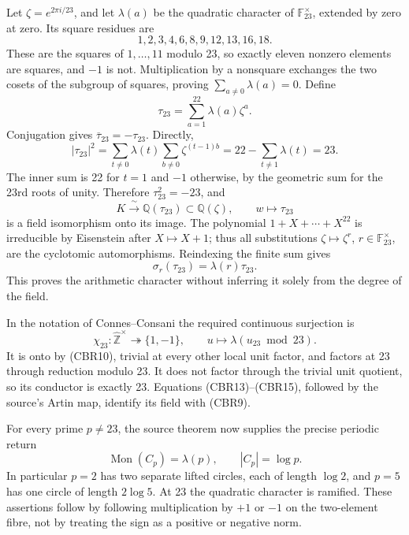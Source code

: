 \documentclass[
  10pt,
  a4paper,
]{article}
\begin{document}
Let \(\zeta=e^{2\pi i/23}\), and let \(\lambda(a)\) be the quadratic
character of \(\mathbb F_{23}^{\times}\), extended by zero at zero. Its
square residues are \[
1,2,3,4,6,8,9,12,13,16,18.
\tag{CBR10}
\] These are the squares of \(1,\ldots,11\) modulo 23, so exactly eleven
nonzero elements are squares, and \(-1\) is not. Multiplication by a
nonsquare exchanges the two cosets of the subgroup of squares, proving
\(\sum_{a\ne0}\lambda(a)=0\). Define \[
\tau_{23}=\sum_{a=1}^{22}\lambda(a)\zeta^a.
\tag{CBR11}
\] Conjugation gives \(\overline{\tau}_{23}=-\tau_{23}\). Directly, \[
|\tau_{23}|^2
=\sum_{t\ne0}\lambda(t)\sum_{b\ne0}\zeta^{(t-1)b}
=22-\sum_{t\ne1}\lambda(t)=23.
\tag{CBR12}
\] The inner sum is 22 for \(t=1\) and \(-1\) otherwise, by the
geometric sum for the 23rd roots of unity. Therefore
\(\tau_{23}^2=-23\), and \[
K\xrightarrow{\ \sim\ }\mathbb Q(\tau_{23})\subset\mathbb Q(\zeta),
\qquad w\longmapsto\tau_{23}
\tag{CBR13}
\] is a field isomorphism onto its image. The polynomial
\(1+X+\cdots+X^{22}\) is irreducible by Eisenstein after
\(X\mapsto X+1\); thus all substitutions \(\zeta\mapsto\zeta^r\),
\(r\in\mathbb F_{23}^{\times}\), are the cyclotomic automorphisms.
Reindexing the finite sum gives \[
\sigma_r(\tau_{23})=\lambda(r)\tau_{23}.
\tag{CBR14}
\] This proves the arithmetic character without inferring it solely from
the degree of the field.

In the notation of Connes--Consani the required continuous surjection is
\[
\chi_{23}:\widehat{\mathbb Z}^{\times}\twoheadrightarrow\{1,-1\},
\qquad u\longmapsto\lambda(u_{23}\bmod23).
\tag{CBR15}
\] It is onto by (CBR10), trivial at every other local unit factor, and
factors at 23 through reduction modulo 23. It does not factor through
the trivial unit quotient, so its conductor is exactly 23. Equations
(CBR13)--(CBR15), followed by the source's Artin map, identify its field
with (CBR9).

For every prime \(p\ne23\), the source theorem now supplies the precise
periodic return \[
\operatorname{Mon}(C_p)=\lambda(p),\qquad |C_p|=\log p.
\tag{CBR16}
\] In particular \(p=2\) has two separate lifted circles, each of length
\(\log2\), and \(p=5\) has one circle of length \(2\log5\). At 23 the
quadratic character is ramified. These assertions follow by following
multiplication by \(+1\) or \(-1\) on the two-element fibre, not by
treating the sign as a positive or negative norm.
\end{document}
